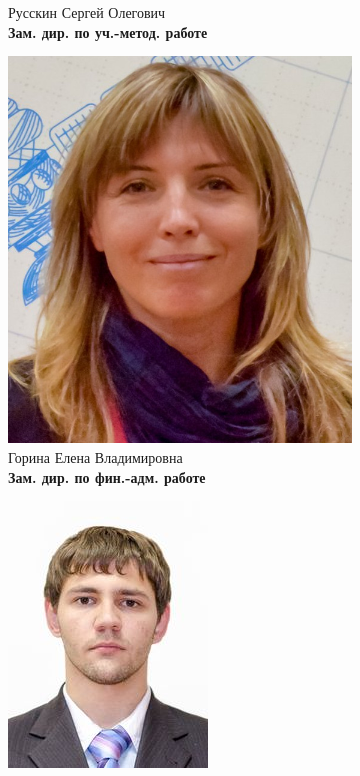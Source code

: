 \documentclass[14pt]{extarticle}
\begin{document}
\begin{figure}[h!]
\begin{subfigure}[b]{0.5\linewidth}
        \caption{Русскин Сергей Олегович \\ \textbf{Зам. дир. по уч.-метод. работе}}
    \end{subfigure}
    \begin{subfigure}[b]{0.32\linewidth}
        \centering
        \includegraphics[width=0.75\linewidth]{resources/gorin.jpg}
        \caption{Горина Елена Владимировна \\ \textbf{Зам. дир. по
        фин.-адм. работе}}
    \end{subfigure}
    \begin{subfigure}[b]{0.32\linewidth}
        \centering
        \includegraphics[width=0.75\linewidth]{resources/lvovich.jpeg}

\end{subfigure}
\end{figure}
\end{document}
